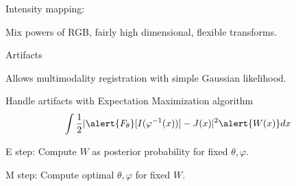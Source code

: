 \documentclass{beamer}
\newcommand\blfootnote[1]{%
  \begingroup
  \renewcommand\thefootnote{}\footnote{#1}%
  \addtocounter{footnote}{-1}%
  \endgroup
}
\begin{document}
\begin{frame}{Intensity mapping: }
{\begin{center}
\end{center}
\vspace{-0.5em}
Mix powers of RGB, fairly high dimensional, flexible transforms.  
}%

\end{frame}





\begin{frame}{Artifacts}

Allows multimodality registration with simple Gaussian likelihood.


Handle artifacts with Expectation Maximization algorithm
\begin{align*}
\int \frac12 |\alert{F_\theta} [I(\varphi^{-1}(x))] - J(x)|^2\alert{W(x)} dx
\end{align*}

\alert{E step}: Compute $W$ as posterior probability for fixed $\theta,\varphi$.

\alert{M step}: Compute optimal $\theta,\varphi$ for fixed $W$.




\centering
{}~
\end{frame}
\end{document}
